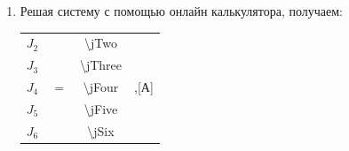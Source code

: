 \documentclass[12pt]{article}
\begin{document}
\begin{enumerate}
			
			\begin{tabular}{|ccccc|c|c|c|c|}
				$1$			&	$1$			&	$0$			& 	$0$				&	$0$			&		&	$J_2$	&		&	\num{\jOne}				\\
				$0$			&	$-1$			&	$-1$			& 	$1$				&	$0$			&		&	$J_3$	&		&	$0$						\\
				$-1$			&	$0$			&	$0$			& 	$-1$				&	$1$			&	x	&	$J_4$	&    $=$	&	$0$						\\
				$0$			&	$0$			&	\num{\rFour}	& 	\num{\rFive}		&	\num{\rSix}	&		&	$J_5$	&		&	\num{\eFourFive}			\\
			  \num{-\rThree}	&	\num{\rTwo}	&	$0$			& 	\num{\rFive}		&	$0$			&		&	$J_5$	&		&	\num{\eFive}				\\		
			\end{tabular}
			
			\item Решая систему с помощью онлайн калькулятора, получаем: 
			
			\begin{tabular}{|c|c|c|c}
				$J_2$	&		&	\num{\jTwo}	&		\\
				$J_3$	&		&	\num{\jThree}	&		\\
				$J_4$	&   $=$	&	\num{\jFour}	&	,[А]	\\
				$J_5$	&		&	\num{\jFive}	&		\\
				$J_6$	&		&	\num{\jSix}	&		\\					
			\end{tabular}
		\end{enumerate}
\end{document}
